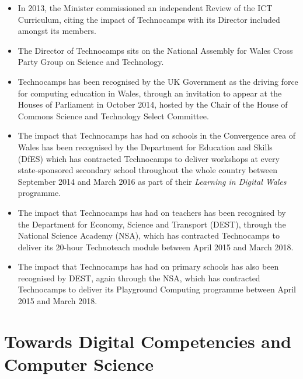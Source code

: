 \begin{itemize}
\item
In 2013, the Minister commissioned an independent Review of the ICT
Curriculum, citing the impact of Technocamps with its Director
included amongst its members.

\item
The Director of Technocamps sits on
the National Assembly for Wales Cross Party Group on Science and Technology.

\item
Technocamps has been recognised by the UK Government as the driving
force for computing education in Wales, through an invitation to
appear at the Houses of Parliament in October 2014, hosted by the
Chair of the House of Commons Science and Technology Select Committee.

\item
The impact that Technocamps has had on schools in the Convergence area
of Wales has been recognised by the Department for Education and Skills (DfES)
which has contracted Technocamps to deliver workshops at every
state-sponsored secondary school throughout the whole country between
September 2014 and March 2016 as part of their \emph{Learning in
Digital Wales} programme.

\item
The impact that Technocamps has had on teachers has been recognised by
the Department for Economy, Science and Transport (DEST), through the
National Science Academy (NSA), which has contracted Technocamps to deliver
its 20-hour Technoteach module between April 2015 and March 2018.

\item
The impact that Technocamps has had on primary schools has also been
recognised by DEST, again through the NSA, which has contracted
Technocamps to deliver its Playground Computing programme between
April 2015 and March 2018.

\end{itemize}

\section{Towards Digital Competencies and Computer Science}


